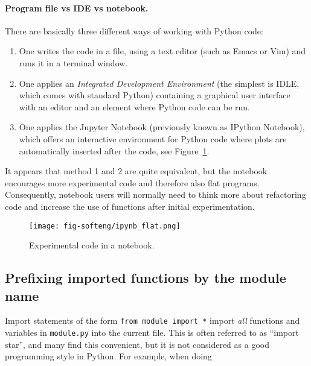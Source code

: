 \documentclass[graybox,sectrefs,envcountresetchap,open=right,final]{svmonodo}
\begin{document}
\paragraph{Program file vs IDE vs notebook.}
There are basically three different ways of working with Python code:

\begin{enumerate}
\item One writes the code in a file, using a text editor (such as
   Emacs or Vim) and runs it in a terminal window.

\item One applies an \emph{Integrated Development Environment} (the simplest is IDLE, which comes with standard Python) containing a graphical user interface with an editor and an element where Python code can be run.

\item One applies the Jupyter Notebook (previously known as IPython Notebook),
   which offers an interactive environment for Python code where
   plots are automatically inserted after the code, see Figure~\ref{softeng1:ipynb}.
\end{enumerate}

\noindent
It appears that method 1 and 2 are quite equivalent, but the notebook
encourages more experimental code and therefore also flat programs.
Consequently, notebook users will normally need to think more about
refactoring code and increase the use of functions after initial
experimentation.


\begin{figure}[!ht]  %
  \centerline{\texttt{[image: fig-softeng/ipynb\_flat.png]}}
  \caption{
  Experimental code in a notebook. \label{softeng1:ipynb}
  }
\end{figure}



\subsection{Prefixing imported functions by the module name}
\label{softeng1:basic:modprefix}


Import statements of the form \texttt{from module import *} import
\emph{all} functions and variables in \texttt{module.py} into the current file.
This is often referred to as ``import star'', and
many find this convenient, but it is not considered as a good
programming style in Python.
For example, when doing
\end{document}
